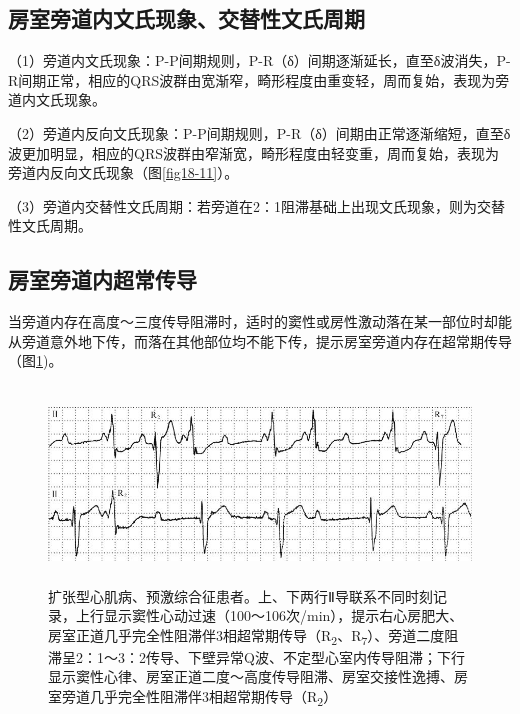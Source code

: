 \protect\hypertarget{text00036.htmlux5cux23subid426}{}{}

\subsection{房室旁道内文氏现象、交替性文氏周期}

（1）旁道内文氏现象：P-P间期规则，P-R（δ）间期逐渐延长，直至δ波消失，P-R间期正常，相应的QRS波群由宽渐窄，畸形程度由重变轻，周而复始，表现为旁道内文氏现象。

（2）旁道内反向文氏现象：P-P间期规则，P-R（δ）间期由正常逐渐缩短，直至δ波更加明显，相应的QRS波群由窄渐宽，畸形程度由轻变重，周而复始，表现为旁道内反向文氏现象（图\ref{fig18-11}）。

（3）旁道内交替性文氏周期：若旁道在2：1阻滞基础上出现文氏现象，则为交替性文氏周期。

\protect\hypertarget{text00036.htmlux5cux23subid427}{}{}

\subsection{房室旁道内超常传导}

当旁道内存在高度～三度传导阻滞时，适时的窦性或房性激动落在某一部位时却能从旁道意外地下传，而落在其他部位均不能下传，提示房室旁道内存在超常期传导（图\ref{fig29-8})。

\begin{figure}[!htbp]
 \centering
 \includegraphics[width=5.61458in,height=2.05208in]{./images/Image00492.jpg}
 \captionsetup{justification=centering}
 \caption{扩张型心肌病、预激综合征患者。上、下两行Ⅱ导联系不同时刻记录，上行显示窦性心动过速（100～106次/min），提示右心房肥大、房室正道几乎完全性阻滞伴3相超常期传导（R\textsubscript{2}、R\textsubscript{7}）、旁道二度阻滞呈2：1～3：2传导、下壁异常Q波、不定型心室内传导阻滞；下行显示窦性心律、房室正道二度～高度传导阻滞、房室交接性逸搏、房室旁道几乎完全性阻滞伴3相超常期传导（R\textsubscript{2}）}
 \label{fig29-8}
  \end{figure} 


